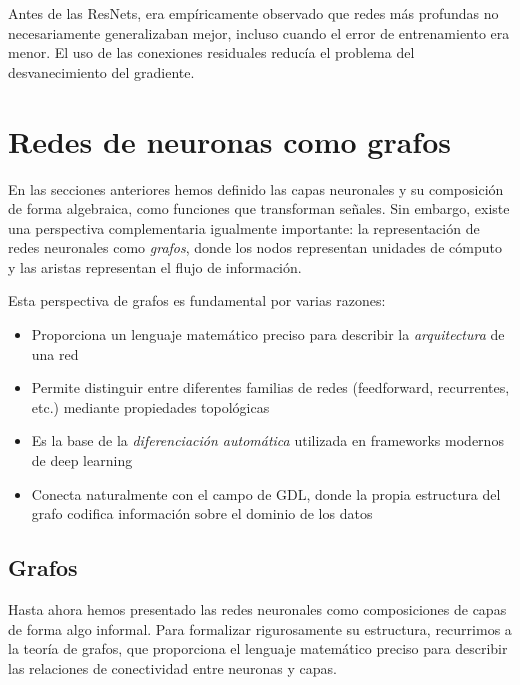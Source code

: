 Antes de las ResNets, era empíricamente observado que redes más profundas no necesariamente generalizaban mejor, incluso cuando el error de entrenamiento era menor. El uso de las conexiones residuales reducía el problema del desvanecimiento del gradiente.

\section{Redes de neuronas como grafos}\label{sec:redes_grafos}

En las secciones anteriores hemos definido las capas neuronales y su composición de forma algebraica, como funciones que transforman señales. Sin embargo, existe una perspectiva complementaria igualmente importante: la representación de redes neuronales como \textit{grafos}, donde los nodos representan unidades de cómputo y las aristas representan el flujo de información.

Esta perspectiva de grafos es fundamental por varias razones:
\begin{itemize}
    \item Proporciona un lenguaje matemático preciso para describir la \textit{arquitectura} de una red
    \item Permite distinguir entre diferentes familias de redes (feedforward, recurrentes, etc.) mediante propiedades topológicas
    \item Es la base de la \textit{diferenciación automática} utilizada en frameworks modernos de deep learning
    \item Conecta naturalmente con el campo de \gls{GDL}, donde la propia estructura del grafo codifica información sobre el dominio de los datos
\end{itemize}

\subsection{Grafos}

Hasta ahora hemos presentado las redes neuronales como composiciones de capas de forma algo informal. Para formalizar rigurosamente su estructura, recurrimos a la teoría de grafos, que proporciona el lenguaje matemático preciso para describir las relaciones de conectividad entre neuronas y capas.

